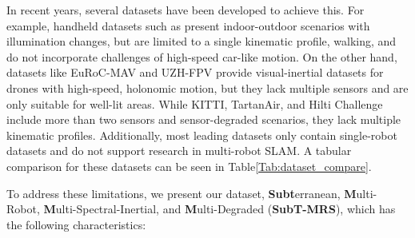 \documentclass[10pt,twocolumn,letterpaper]{article}
\begin{document}






In recent years, several datasets have been developed to achieve this. For example, handheld datasets such as \cite{helmberger2022hilti, ramezani2020newer, pfrommer2017penncosyvio, schubert2018tum, zuniga2020vi} present indoor-outdoor scenarios with illumination changes, but are limited to a single kinematic profile, walking, and do not incorporate challenges of high-speed car-like motion. On the other hand, datasets like EuRoC-MAV\cite{Burri25012016} and UZH-FPV\cite{Delmerico19icra} provide visual-inertial datasets for drones with high-speed, holonomic motion, but they lack multiple sensors and are only suitable for well-lit areas. While KITTI, TartanAir, and Hilti Challenge\cite{Geiger2012CVPR, tartanair2020iros, helmberger2022hilti} include more than two sensors and sensor-degraded scenarios, they lack multiple kinematic profiles. Additionally, most leading datasets only contain single-robot datasets and do not support research in multi-robot SLAM. A tabular comparison for these datasets can be seen in Table\ref{Tab:dataset_compare}.

To address these limitations, we present our dataset, \textbf{Subt}erranean, \textbf{M}ulti-Robot, \textbf{M}ulti-Spectral-Inertial, and \textbf{M}ulti-Degraded (\textbf{SubT-MRS}), which has the following characteristics:
\end{document}
